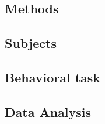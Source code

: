 \documentclass[9pt,biorxiv,lineno,onehalfspacing]{lapreprint}
\begin{document}
\begin{refsection}
\newpage
\section{Methods}
\subsection{Subjects}

\subsection{Behavioral task}

\subsection{Data Analysis}




\newcommand{\supplementarysection}{%
  \setcounter{figure}{0}%
  \let\oldthefigure\thefigure%
  \renewcommand{\thefigure}{S\oldthefigure}%
}

\supplementarysection


\clearpage
\printbibliography[title=Methods References]
\end{refsection}


\end{document}
